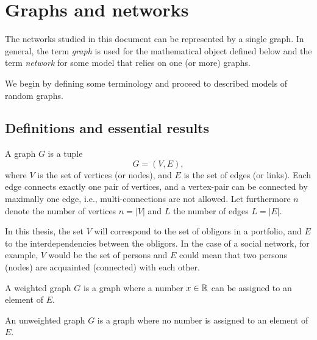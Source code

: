 \chapter{Graphs and networks} %
\label{cha:graphs_and_networks}



The networks studied in this document can be represented by a single graph.
In general, the term \textit{graph} is used for the mathematical object defined below and the term \textit{network} for some model that relies on one (or more) graphs.

We begin by defining some terminology and proceed to described models of random graphs.

\section{Definitions and essential results} %
\label{sec:definitions_and_essential_results}

\begin{definition}A graph $G$ is a tuple
\begin{equation}
G = (V,E),
\end{equation}
\noindent where $V$ is the set of vertices (or nodes), and $E$ is the set of edges (or links).
Each edge connects exactly one pair of vertices, and a vertex-pair can be connected by maximally one edge, i.e., multi-connections are not allowed.
Let furthermore $n$ denote the number of vertices $n = |V|$ and $L$ the number of edges $L = |E|$.
\end{definition}


In this thesis, the set $V$ will correspond to the set of obligors in a portfolio, and $E$ to the interdependencies between the obligors.
In the case of a social network, for example, $V$ would be the set of persons and $E$ could mean that two persons (nodes) are acquainted (connected) with each other.

\begin{definition}A weighted graph $G$ is a graph where a number $x \in {\mathbb R}$ can be assigned to an element of $E$.\end{definition}

\begin{definition}An unweighted graph $G$ is a graph where no number is assigned to an element of $E$.\end{definition}


